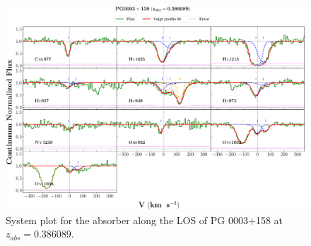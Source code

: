   
  \newpage
  \thispagestyle{empty}
  
  \begin{landscape}
  
      \begin{figure}
      \centering
      \vspace{-10mm}
      \hspace*{-20mm}
      \includegraphics[width=1.1\linewidth]{System-Plots/PG0003+158_z=0.386089_sys_plot.png}
      \caption{System plot for the absorber along the LOS of PG 0003+158 at $z_{abs} = 0.386089$. }
      \end{figure}
      
  \end{landscape}
  
  
